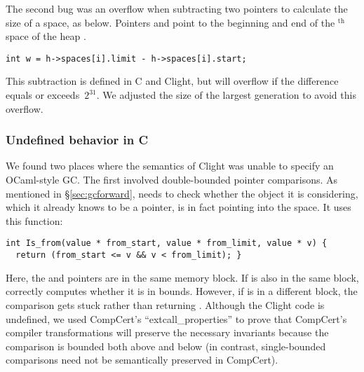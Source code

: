 The second bug was an overflow when subtracting two pointers
to calculate the size of a space, as below. Pointers  and 
point to the beginning and end of the $^{\text{th}}$ space of the
heap .
\begin{lstlisting}[numbers=none]
  int w = h->spaces[i].limit - h->spaces[i].start;
\end{lstlisting}
This subtraction is defined in C and Clight, but
will overflow if the difference equals
or exceeds~$2^{31}$. We adjusted the size of the largest generation to avoid this overflow.

\subsubsection*{Undefined behavior in C} %
We found two places where the semantics of Clight was unable to specify an OCaml-style GC.
The first involved double-bounded pointer comparisons.
As mentioned in \S\ref{sec:gcforward},  needs to
check whether the object it is considering, which it already knows to be a pointer,
is in fact pointing into the  space. It uses this function:
\begin{lstlisting}[numbers=none]
int Is_from(value * from_start, value * from_limit, value * v) {
  return (from_start <= v && v < from_limit); }
\end{lstlisting}
Here, the  and  pointers are in the same
memory block. If  is also in the same block, 
correctly computes whether it is in bounds.
However, if  is in a different block, the comparison gets stuck rather than
returning .
Although the Clight code is undefined, we used CompCert's ``extcall{\_}properties''
to prove that CompCert's compiler transformations will preserve the necessary invariants
because the comparison is bounded both above and below (in contrast, single-bounded
comparisons need not be semantically preserved in CompCert).

